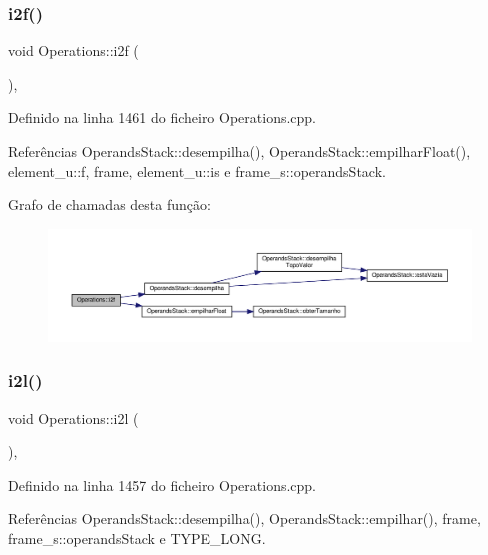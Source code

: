 \subsubsection{\texorpdfstring{i2f()}{i2f()}}
{\footnotesize\ttfamily void Operations\+::i2f (\begin{DoxyParamCaption}{ }\end{DoxyParamCaption})\hspace{0.3cm}{\ttfamily [static]}, {\ttfamily [private]}}



Definido na linha 1461 do ficheiro Operations.\+cpp.



Referências Operands\+Stack\+::desempilha(), Operands\+Stack\+::empilhar\+Float(), element\+\_\+u\+::f, frame, element\+\_\+u\+::is e frame\+\_\+s\+::operands\+Stack.

Grafo de chamadas desta função\+:\nopagebreak
\begin{figure}[H]
\begin{center}
\leavevmode
\includegraphics[width=350pt]{classOperations_a4880878630a620c325840fc7980dc131_cgraph}
\end{center}
\end{figure}
\mbox{\label{classOperations_ae5d28665a74411cbb880e3007c5405e8}} 
\subsubsection{\texorpdfstring{i2l()}{i2l()}}
{\footnotesize\ttfamily void Operations\+::i2l (\begin{DoxyParamCaption}{ }\end{DoxyParamCaption})\hspace{0.3cm}{\ttfamily [static]}, {\ttfamily [private]}}



Definido na linha 1457 do ficheiro Operations.\+cpp.



Referências Operands\+Stack\+::desempilha(), Operands\+Stack\+::empilhar(), frame, frame\+\_\+s\+::operands\+Stack e T\+Y\+P\+E\+\_\+\+L\+O\+NG.

